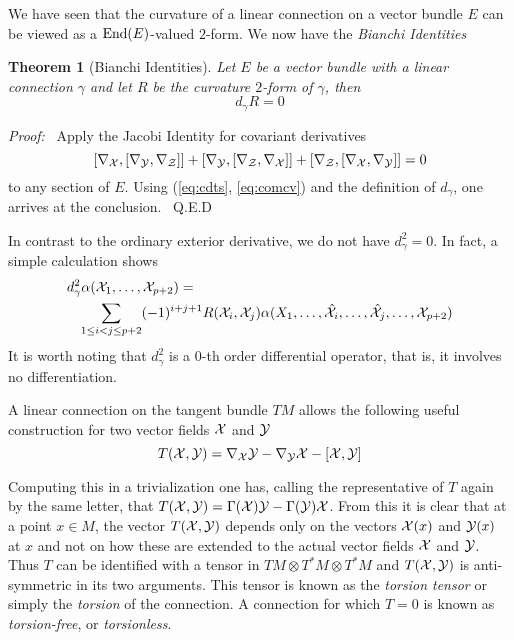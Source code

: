 \documentclass[12pt,titlepage]{article}
\def\cX{{\cal X}}
\def\cY{{\cal Y}}
\def\cZ{{\cal Z}}
\def\End{\hbox{End}}
\newtheorem{theorem}{Theorem}
\newenvironment{proof}{{\em Proof:\/}\ }{\ Q.E.D}
\begin{document}
We have seen that the curvature of a linear connection on a vector
bundle \(E\) can be viewed as a \(\End(E)\)-valued \(2\)-form. We now
have the {\em Bianchi Identities\/}
\begin{theorem}[Bianchi Identities]
%
Let \(E\) be a vector bundle with a linear connection \(\gamma\) and let
\(R\) be the curvature \(2\)-form of \(\gamma\), then
\begin{equation}\label{eq:bianchi}
d_\gamma R = 0
\end{equation}
\end{theorem}
\begin{proof}
Apply the Jacobi Identity for covariant derivatives 
\[
 [\nabla_{\cX},[\nabla_{\cY},\nabla_{\cZ}]]+
[\nabla_{\cY},[\nabla_{\cZ},\nabla_{\cX}]]+
[\nabla_{\cZ},[\nabla_{\cX},\nabla_{\cY}]]=0
\]
to any section of \(E\). Using (\ref{eq:cdts}, \ref{eq:comcv})
and the definition of \(d_\gamma\), one arrives at the conclusion.
\end{proof}

In contrast to the ordinary exterior derivative, we do not have
\(d_\gamma^2 = 0\). 
In fact, a simple calculation shows
\begin{eqnarray*}
\lefteqn{d_\gamma^2\alpha(\cX_1,\dots,\cX_{p+2})=}\\
& & \sum_{1\le i < j \le p+2}(-1)^{i+j+1}
R(\cX_i,\cX_j)\alpha(X_1,\dots,\hat \cX_i, \dots,
\hat\cX_j,\dots,\cX_{p+2})
\end{eqnarray*}
It is worth noting that \(d_\gamma^2\) is a \(0\)-th order differential
operator, that is, it involves no differentiation.

A linear connection on the tangent bundle \(TM\) allows the following
useful construction  
for two vector fields \(\cX\) and \(\cY\)
\[%
T(\cX,\cY) =\nabla_\cX\cY-\nabla_\cY\cX-[\cX,\cY]
\]%

Computing this in a  trivialization one has, calling the
representative of \(T\) again by the same letter, that \(T(\cX,\cY)
=\Gamma(\cX)\cY -\Gamma(\cY)\cX\). From this it is clear that at a point
\(x\in  M\), the vector \(T(\cX,\cY)\)  depends only on the vectors
\(\cX(x)\) and \(\cY(x)\) at \(x\) and not on how these are extended to the
actual vector fields \(\cX\) and \(\cY\). Thus \(T\) can be identified with
a  tensor in \(TM\otimes T^*M\otimes T^*M\) and \(T(\cX,\cY)\) is
anti-symmetric in its two arguments. This tensor is known as the {\em
torsion tensor\/}
%
or simply the {\em
torsion\/}
%
of the connection. A connection for which \(T=0\) is
known as {\em torsion-free\/}, or {\em torsionless\/}.
%
%
\end{document}
